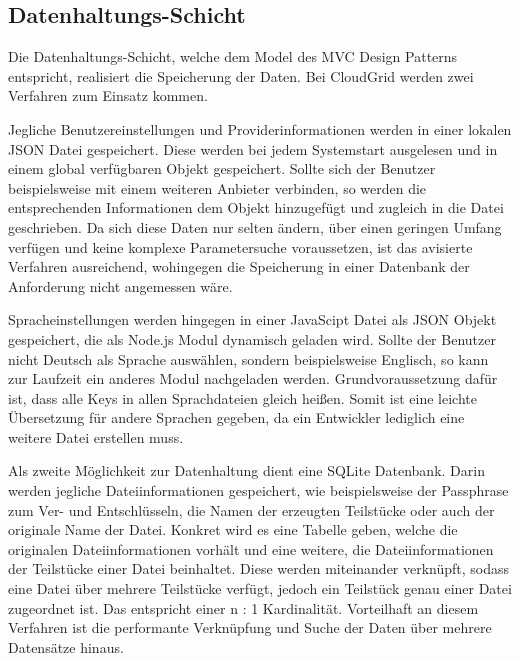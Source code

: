 \subsection{Datenhaltungs-Schicht}
\label{systementwurf-datenhaltung}
Die Datenhaltungs-Schicht, welche dem Model des \ac{MVC} Design Patterns entspricht, realisiert die Speicherung der Daten.
Bei CloudGrid werden zwei Verfahren zum Einsatz kommen.

Jegliche Benutzereinstellungen und Providerinformationen werden in einer lokalen \ac{JSON} Datei gespeichert.
Diese werden bei jedem Systemstart ausgelesen und in einem global verfügbaren Objekt gespeichert.
Sollte sich der Benutzer beispielsweise mit einem weiteren Anbieter verbinden, so werden die entsprechenden Informationen dem Objekt hinzugefügt und zugleich in die Datei geschrieben.
Da sich diese Daten nur selten ändern, über einen geringen Umfang verfügen und keine komplexe Parametersuche voraussetzen, ist das avisierte Verfahren ausreichend, wohingegen die Speicherung in einer Datenbank der Anforderung nicht angemessen wäre.

Spracheinstellungen werden hingegen in einer JavaScipt Datei als \ac{JSON} Objekt gespeichert, die als Node.js Modul dynamisch geladen wird.
Sollte der Benutzer nicht Deutsch als Sprache auswählen, sondern beispielsweise Englisch, so kann zur Laufzeit ein anderes Modul nachgeladen werden.
Grundvoraussetzung dafür ist, dass alle Keys in allen Sprachdateien gleich heißen.
Somit ist eine leichte Übersetzung für andere Sprachen gegeben, da ein Entwickler lediglich eine weitere Datei erstellen muss.

Als zweite Möglichkeit zur Datenhaltung dient eine SQLite Datenbank.
Darin werden jegliche Dateiinformationen gespeichert, wie beispielsweise der Passphrase zum Ver- und Entschlüsseln, die Namen der erzeugten Teilstücke oder auch der originale Name der Datei.
Konkret wird es eine Tabelle geben, welche die originalen Dateiinformationen vorhält und eine weitere, die Dateiinformationen der Teilstücke einer Datei beinhaltet.
Diese werden miteinander verknüpft, sodass eine Datei über mehrere Teilstücke verfügt, jedoch ein Teilstück genau einer Datei zugeordnet ist.
Das entspricht einer n : 1 Kardinalität.
Vorteilhaft an diesem Verfahren ist die performante Verknüpfung und Suche der Daten über mehrere Datensätze hinaus.

